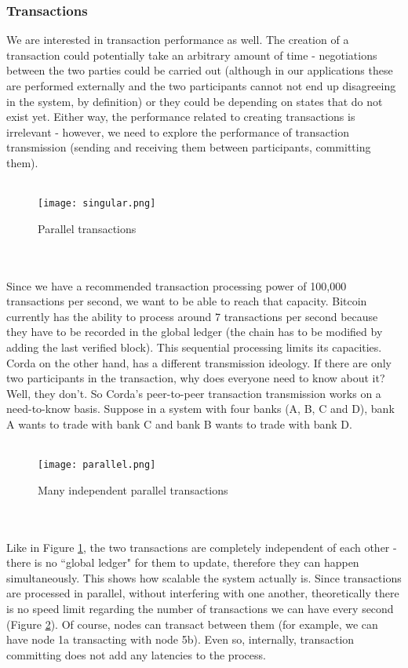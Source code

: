 \documentclass[12pt,twoside]{article}
\begin{document}
\subsubsection{Transactions}
\label{sub:TP}
We are interested in transaction performance as well. The creation of a transaction could potentially take an arbitrary amount of time - negotiations between the two parties could be carried out (although in our applications these are performed externally and the two participants cannot not end up disagreeing in the system, by definition) or they could be depending on states that do not exist yet. Either way, the performance related to creating transactions is irrelevant - however, we need to explore the performance of transaction transmission (sending and receiving them between participants, committing them). 
\\ \\
\begin{figure}[!htb]
\centering
\texttt{[image: singular.png]}
\caption{Parallel transactions}
\centering
\label{fig:trading}
\end{figure}
\\ \\
Since we have a recommended transaction processing power of 100,000 transactions per second, we want to be able to reach that capacity. Bitcoin currently has the ability to process around 7 transactions per second because they have to be recorded in the global ledger (the chain has to be modified by adding the last verified block). This sequential processing limits its capacities. Corda on the other hand, has a different transmission ideology. If there are only two participants in the transaction, why does everyone need to know about it? Well, they don't. So Corda's peer-to-peer transaction transmission works on a need-to-know basis. Suppose in a system with four banks (A, B, C and D), bank A wants to trade with bank C and bank B wants to trade with bank D. 
\\ \\
\begin{figure}[!htb]
\centering
\texttt{[image: parallel.png]}
\caption{Many independent parallel transactions}
\centering
\label{fig:infinity}
\end{figure}
\\ \\
Like in Figure \ref{fig:trading}, the two transactions are completely independent of each other - there is no ``global ledger" for them to update, therefore they can happen simultaneously. This shows how scalable the system actually is. Since transactions are processed in parallel, without interfering with one another, theoretically there is no speed limit regarding the number of transactions we can have every second (Figure \ref{fig:infinity}). Of course, nodes can transact between them (for example, we can have node 1a transacting with node 5b). Even so, internally, transaction committing does not add any latencies to the process.
\end{document}
